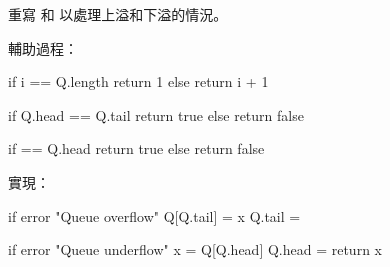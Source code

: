 \startEXERCISE
重寫  和  以處理上溢和下溢的情況。
\stopEXERCISE

\startANSWER
輔助過程：

\startCLRSCODE
if i == Q.length
	return 1
else
	return i + 1
\stopCLRSCODE

\startCLRSCODE
if Q.head == Q.tail
	return true
else
	return false
\stopCLRSCODE

\startCLRSCODE
if  == Q.head
	return true
else
	return false
\stopCLRSCODE

實現：

\startCLRSCODE
if 
	error "Queue overflow"
Q[Q.tail] = x
Q.tail = 
\stopCLRSCODE

\startCLRSCODE
if 
	error "Queue underflow"
x = Q[Q.head]
Q.head = 
return x
\stopCLRSCODE
\stopANSWER
